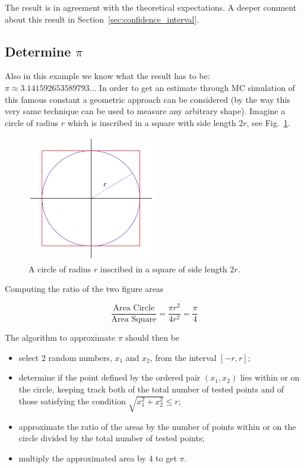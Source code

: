 The result is in agreement with the theoretical expectations. A deeper comment about this result in Section~\ref{sec:confidence_interval}.

\subsection{Determine \(\pi\)}
\label{determine-pi}

Also in this example we know what the result has to be: \(\pi\approx 3.141592653589793\ldots\) In order to get an estimate through MC simulation of this famous constant a geometric approach can be considered (by the way this very same technique can be used to measure any arbitrary shape). Imagine a circle of radius \(r\) which is inscribed in a square with side length \(2r\), see Fig.~\ref{fig:circle_inscribed}.

\begin{figure}[htb]
\centering
\includegraphics[width=0.5\textwidth]{figures/circle_inscribed}
\caption{A circle of radius $r$ inscribed in a square of side length $2r$.}
\label{fig:circle_inscribed}
\end{figure}

Computing the ratio of the two figure areas

\begin{equation}
\frac{\textrm{Area Circle}}{\textrm{Area Square}} = \frac{\pi r^2}{4r^2} = \frac{\pi}{4} 
\end{equation}

The algorithm to approximate \(\pi\) should then be

\begin{itemize}
\item select 2 random numbers, \(x_1\) and \(x_2\), from the interval
\([-r,r]\); 
\item determine if the point defined by the ordered pair \((x_1, x_2)\) lies within or on the circle, keeping track both of the total number of tested points and of those satisfying the condition $\sqrt{x_1^2 + x_2^2}\leq r$; 
\item approximate the ratio of the areas by the number of points within or on the circle divided by the total number of tested points; 
\item multiply the approximated area by 4 to get \(\pi\).
\end{itemize}

